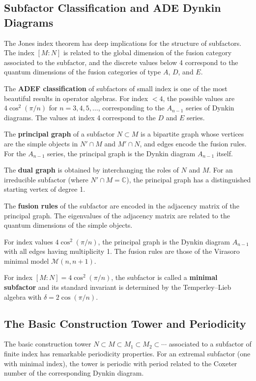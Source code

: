 \subsection*{Subfactor Classification and ADE Dynkin Diagrams}

The Jones index theorem has deep implications for the structure of subfactors. The index $[M:N]$ is related to the global dimension of the fusion category associated to the subfactor, and the discrete values below 4 correspond to the quantum dimensions of the fusion categories of type $A$, $D$, and $E$.

The \textbf{ADEF classification} of subfactors of small index is one of the most beautiful results in operator algebras. For index $< 4$, the possible values are $4\cos^2(\pi/n)$ for $n = 3, 4, 5, \ldots$, corresponding to the $A_{n-1}$ series of Dynkin diagrams. The values at index 4 correspond to the $D$ and $E$ series.

The \textbf{principal graph} of a subfactor $N \subset M$ is a bipartite graph whose vertices are the simple objects in $N' \cap M$ and $M' \cap N$, and edges encode the fusion rules. For the $A_{n-1}$ series, the principal graph is the Dynkin diagram $A_{n-1}$ itself.

The \textbf{dual graph} is obtained by interchanging the roles of $N$ and $M$. For an irreducible subfactor (where $N' \cap M = \mathbb{C}$), the principal graph has a distinguished starting vertex of degree 1.

The \textbf{fusion rules} of the subfactor are encoded in the adjacency matrix of the principal graph. The eigenvalues of the adjacency matrix are related to the quantum dimensions of the simple objects.

For index values $4\cos^2(\pi/n)$, the principal graph is the Dynkin diagram $A_{n-1}$ with all edges having multiplicity 1. The fusion rules are those of the Virasoro minimal model $\mathcal{M}(n, n+1)$.

For index $[M:N] = 4\cos^2(\pi/n)$, the subfactor is called a \textbf{minimal subfactor} and its standard invariant is determined by the Temperley--Lieb algebra with $\delta = 2\cos(\pi/n)$.

\subsection*{The Basic Construction Tower and Periodicity}

The basic construction tower $N \subset M \subset M_1 \subset M_2 \subset \cdots$ associated to a subfactor of finite index has remarkable periodicity properties. For an extremal subfactor (one with minimal index), the tower is periodic with period related to the Coxeter number of the corresponding Dynkin diagram.

